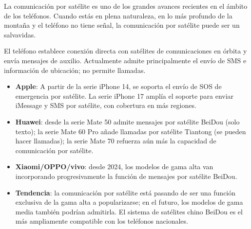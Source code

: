 


La comunicación por satélite es uno de los grandes avances recientes en el ámbito de los teléfonos. Cuando estás en plena naturaleza, en lo más profundo de la montaña y el teléfono no tiene señal, la comunicación por satélite puede ser un salvavidas.


El teléfono establece conexión directa con satélites de comunicaciones en órbita y envía mensajes de auxilio. Actualmente admite principalmente el envío de SMS e información de ubicación; no permite llamadas.


\begin{itemize}
  \item \textbf{Apple}: A partir de la serie iPhone 14, se soporta el envío de SOS de emergencia por satélite. La serie iPhone 17 amplía el soporte para enviar iMessage y SMS por satélite, con cobertura en más regiones.
  \item \textbf{Huawei}: desde la serie Mate 50 admite mensajes por satélite BeiDou (solo texto); la serie Mate 60 Pro añade llamadas por satélite Tiantong (se pueden hacer llamadas); la serie Mate 70 refuerza aún más la capacidad de comunicación por satélite.
  \item \textbf{Xiaomi/OPPO/vivo}: desde 2024, los modelos de gama alta van incorporando progresivamente la función de mensajes por satélite BeiDou.
  \item \textbf{Tendencia}: la comunicación por satélite está pasando de ser una función exclusiva de la gama alta a popularizarse; en el futuro, los modelos de gama media también podrían admitirla. El sistema de satélites chino BeiDou es el más ampliamente compatible con los teléfonos nacionales.
\end{itemize}


